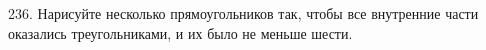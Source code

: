 236. Нарисуйте несколько прямоугольников так, чтобы все внутренние части оказались треугольниками, и их было не меньше шести.\\
